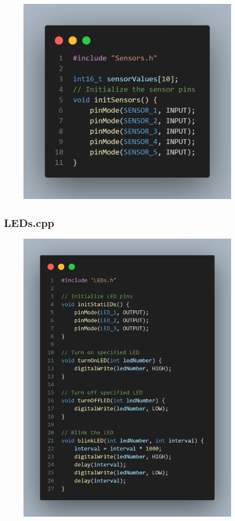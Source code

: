 \documentclass{article}
\begin{document}
\begin{figure}[H]
    \centering
    \includegraphics[width=0.8\linewidth]{REPORT/sensorscode.png}
\end{figure}

\subsection{LEDs.cpp}

\begin{figure}[H]
    \centering
    \includegraphics[width=0.8\linewidth]{REPORT/ledscode.png}
\end{figure}
\end{document}
